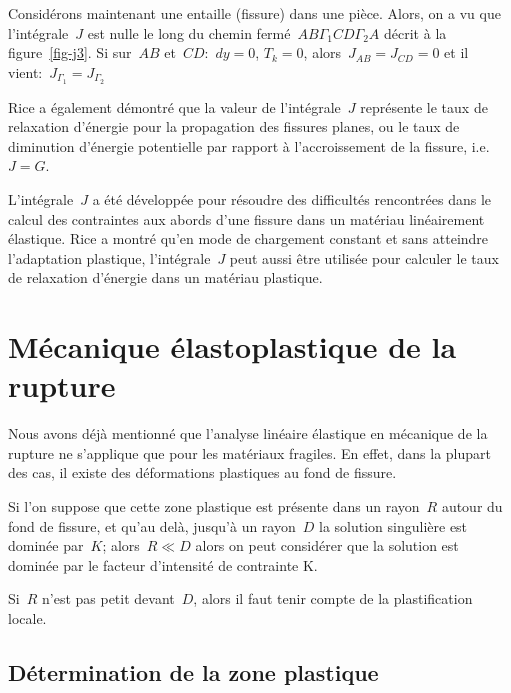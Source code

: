 \medskipvm
Considérons maintenant une entaille (fissure) dans une pièce. Alors, on a vu que l'intégrale~$J$ est nulle le long du chemin fermé~$AB\Gamma_1CD\Gamma_2A$ décrit à la figure~\ref{fig-j3}.
Si sur~$AB$ et~$CD$:~$dy=0$, $T_k=0$, alors~$J_{AB}=J_{CD}=0$
et il vient:~$J_{\Gamma_1} = J_{\Gamma_2}$

\medskip
Rice a également démontré que la valeur de l'intégrale~$J$ représente le taux de relaxation d'énergie pour la propagation des fissures planes, ou le taux de diminution d'énergie potentielle par rapport à l'accroissement de la fissure, i.e.~$J=G$.

\medskip
L'intégrale~$J$ a été développée pour résoudre des difficultés rencontrées dans le calcul des contraintes aux abords d'une fissure dans un matériau linéairement élastique. Rice a montré qu'en mode de chargement constant et sans atteindre l'adaptation plastique, l'intégrale~$J$ peut aussi être utilisée pour calculer le taux de relaxation d'énergie dans un matériau plastique.






\medskip
\section{Mécanique élastoplastique de la rupture}

Nous avons déjà mentionné que l'analyse linéaire élastique en mécanique de la rupture ne s'applique que pour les matériaux fragiles. En effet, dans la plupart des cas, il existe des déformations plastiques au fond de fissure.

Si l'on suppose que cette zone plastique est présente dans un rayon~$R$ autour du fond de fissure, et qu'au delà, jusqu'à un rayon~$D$ la solution singulière est dominée par~$K$; alors~$R \ll D$ alors on peut considérer que la solution est dominée par le facteur d'intensité de contrainte K.

Si~$R$ n'est pas petit devant~$D$, alors il faut tenir compte de la plastification locale.

\medskip
\subsection{Détermination de la zone plastique}

